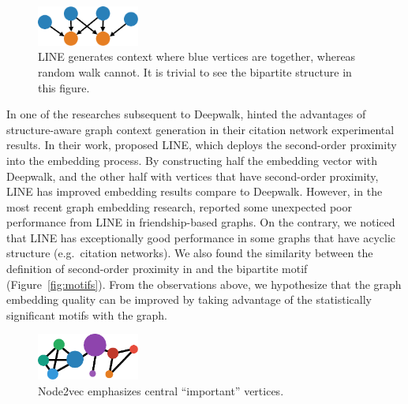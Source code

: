 \documentclass[letterpaper]{article}
\begin{document}
            \begin{figure}
                \centering
                \includegraphics[width=0.3\textwidth]{fig3_line}
                \caption{LINE generates context where blue vertices are together, whereas random walk cannot.
                It is trivial to see the bipartite structure in this figure.}
                \label{fig:line}
            \end{figure}

            In one of the researches subsequent to Deepwalk, \citeauthor{line} hinted the advantages 
            of structure-aware graph context generation in their citation network experimental 
            results. In their work, \citeauthor{line} proposed LINE, which deploys the
            second-order proximity into the embedding process. By constructing half the embedding
            vector with Deepwalk, and the other half with vertices that have second-order proximity,
            LINE has improved embedding results compare to Deepwalk. However, in the most recent
            graph embedding research, \citeauthor{node2vec} reported some unexpected poor performance
            from LINE in friendship-based graphs. On the contrary, we noticed that 
            LINE has exceptionally good performance in some graphs that have acyclic structure 
            (e.g.\ citation networks). We also found the similarity between the definition of 
            second-order proximity in \cite{line} and the bipartite motif (Figure~\ref{fig:motifs}).
            From the observations above, we hypothesize that the graph embedding quality can be
            improved by taking advantage of the statistically significant motifs with the graph.

            \begin{figure}
                \centering
                \includegraphics[width=0.3\textwidth]{fig4_n2v}
                \caption{Node2vec emphasizes central ``important'' vertices.}
                \label{fig:nv}
            \end{figure}
\end{document}
